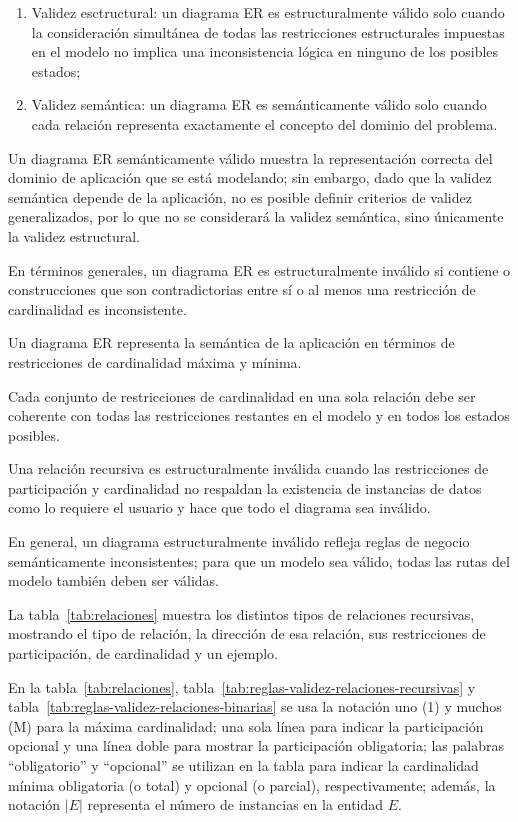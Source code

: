\begin{enumerate}
    \item Validez esctructural: un diagrama ER es estructuralmente válido solo cuando la consideración simultánea de todas las restricciones estructurales impuestas en el modelo no implica una inconsistencia lógica en ninguno de los posibles estados; 
    \item Validez semántica: un diagrama ER es semánticamente válido solo cuando cada relación representa exactamente el concepto del dominio del problema. 
\end{enumerate}


 Un diagrama ER semánticamente válido muestra la representación correcta del dominio de aplicación que se está modelando; sin embargo, dado que la validez semántica depende de la aplicación, no es posible definir criterios de validez generalizados, por lo que no se considerará la validez semántica, sino únicamente la validez estructural.


En términos generales, un diagrama ER es estructuralmente inválido si contiene o construcciones que son contradictorias entre sí o al menos una restricción de cardinalidad es inconsistente.


Un diagrama ER representa la semántica de la aplicación en términos de restricciones de cardinalidad máxima y mínima. 


Cada conjunto de restricciones de cardinalidad en una sola relación debe ser coherente con todas las restricciones restantes en el modelo y en todos los estados posibles.


Una relación recursiva es estructuralmente inválida cuando las restricciones de participación y cardinalidad no respaldan la existencia de instancias de datos como lo requiere el usuario y hace que todo el diagrama sea inválido.


En general, un diagrama estructuralmente inválido refleja reglas de negocio semánticamente inconsistentes; para que un modelo sea válido, todas las rutas del modelo también deben ser válidas.


La tabla~\ref{tab:relaciones} muestra los distintos tipos de relaciones recursivas, mostrando el tipo de relación, la dirección de esa relación, sus restricciones de participación, de cardinalidad y un ejemplo.

En la tabla~\ref{tab:relaciones}, tabla~\ref{tab:reglas-validez-relaciones-recursivas} y tabla~\ref{tab:reglas-validez-relaciones-binarias} se usa la notación uno (1) y muchos (M) para la máxima cardinalidad; una sola línea para indicar la participación opcional y una línea doble para mostrar la participación obligatoria; las palabras ``obligatorio'' y ``opcional'' se utilizan en la tabla para indicar la cardinalidad mínima obligatoria (o total) y opcional (o parcial), respectivamente; además, la notación $|E|$ representa el número de instancias en la entidad $E$.

